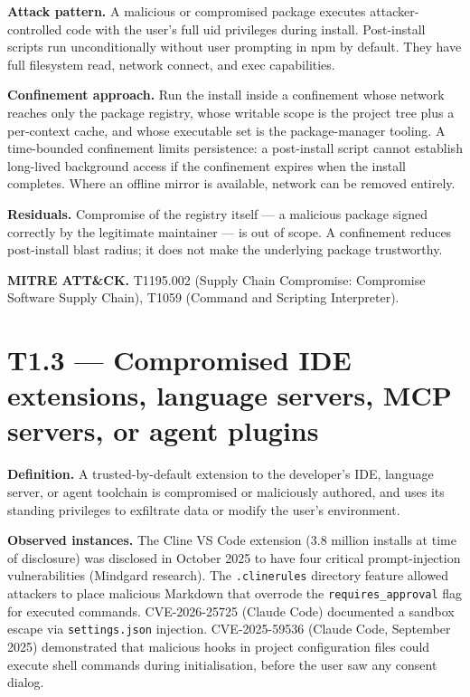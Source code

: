 \textbf{Attack pattern.} A malicious or compromised package executes
attacker-controlled code with the user's full uid privileges during
install. Post-install scripts run unconditionally without user prompting
in npm by default. They have full filesystem read, network connect, and
exec capabilities.

\textbf{Confinement approach.} Run the install inside a confinement
whose network reaches only the package registry, whose writable scope is
the project tree plus a per-context cache, and whose executable set is
the package-manager tooling. A time-bounded confinement limits
persistence: a post-install script cannot establish long-lived
background access if the confinement expires when the install completes.
Where an offline mirror is available, network can be removed entirely.

\textbf{Residuals.} Compromise of the registry itself --- a malicious
package signed correctly by the legitimate maintainer --- is out of
scope. A confinement reduces post-install blast radius; it does not make
the underlying package trustworthy.

\textbf{MITRE ATT\&CK.} T1195.002 (Supply Chain Compromise: Compromise
Software Supply Chain), T1059 (Command and Scripting Interpreter).

\hypertarget{t1.3-compromised-ide-extensions-language-servers-mcp-servers-or-agent-plugins}{%
\section{T1.3 --- Compromised IDE extensions, language servers, MCP
servers, or agent
plugins}\label{t1.3-compromised-ide-extensions-language-servers-mcp-servers-or-agent-plugins}}

\textbf{Definition.} A trusted-by-default extension to the developer's
IDE, language server, or agent toolchain is compromised or maliciously
authored, and uses its standing privileges to exfiltrate data or modify
the user's environment.

\textbf{Observed instances.} The Cline VS Code extension (3.8 million
installs at time of disclosure) was disclosed in October 2025 to have
four critical prompt-injection vulnerabilities (Mindgard research). The
\texttt{.clinerules} directory feature allowed attackers to place
malicious Markdown that overrode the \texttt{requires\_approval} flag
for executed commands. CVE-2026-25725 (Claude Code) documented a sandbox
escape via \texttt{settings.json} injection. CVE-2025-59536 (Claude
Code, September 2025) demonstrated that malicious hooks in project
configuration files could execute shell commands during initialisation,
before the user saw any consent dialog.

